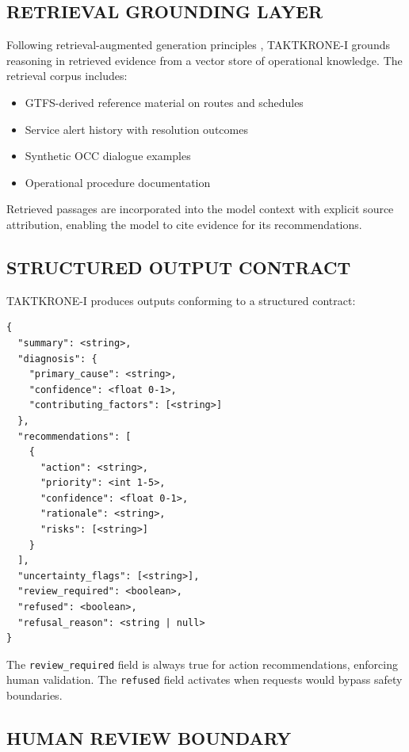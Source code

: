 \documentclass{IEEEoj}
\begin{document}
\subsection{RETRIEVAL GROUNDING LAYER}

Following retrieval-augmented generation principles \cite{lewis2020retrieval}, TAKTKRONE-I grounds reasoning in retrieved evidence from a vector store of operational knowledge. The retrieval corpus includes:

\begin{itemize}
    \item GTFS-derived reference material on routes and schedules
    \item Service alert history with resolution outcomes
    \item Synthetic OCC dialogue examples
    \item Operational procedure documentation
\end{itemize}

Retrieved passages are incorporated into the model context with explicit source attribution, enabling the model to cite evidence for its recommendations.

\subsection{STRUCTURED OUTPUT CONTRACT}

TAKTKRONE-I produces outputs conforming to a structured contract:

\begin{verbatim}
{
  "summary": <string>,
  "diagnosis": {
    "primary_cause": <string>,
    "confidence": <float 0-1>,
    "contributing_factors": [<string>]
  },
  "recommendations": [
    {
      "action": <string>,
      "priority": <int 1-5>,
      "confidence": <float 0-1>,
      "rationale": <string>,
      "risks": [<string>]
    }
  ],
  "uncertainty_flags": [<string>],
  "review_required": <boolean>,
  "refused": <boolean>,
  "refusal_reason": <string | null>
}
\end{verbatim}

The \texttt{review\_required} field is always true for action recommendations, enforcing human validation. The \texttt{refused} field activates when requests would bypass safety boundaries.

\subsection{HUMAN REVIEW BOUNDARY}
\end{document}
